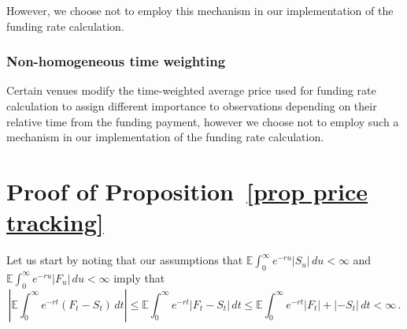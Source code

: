 \documentclass[10pt]{article}
\begin{document}
However, we choose not to employ this mechanism in our implementation of the funding rate calculation.
      
\subsubsection{Non-homogeneous time weighting}

Certain venues modify the time-weighted average price used for funding rate calculation to assign different importance to observations depending on their relative time from the funding payment, however we choose not to employ such a mechanism in our implementation of the funding rate calculation.

\appendix
\section{Proof of Proposition~\ref{prop price tracking}}
Let us start by noting that our assumptions that $\mathbb E\int_0^\infty e^{-ru} |S_u|\,du < \infty$ and $\mathbb E\int_0^\infty e^{-ru} |F_u|\,du < \infty$ imply that 
\[
\left|\mathbb E \int_0^\infty e^{-rt}(F_t-S_t)\,dt\right| \leq \mathbb E \int_0^\infty e^{-rt}\left|F_t-S_t\right|\,dt \leq \mathbb E \int_0^\infty e^{-rt}|F_t|+|-S_t|\,dt < \infty\,.
\]
\end{document}
